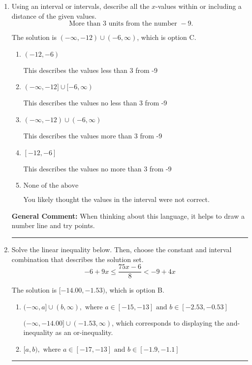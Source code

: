 \documentclass{extbook}[14pt]
\newcommand{\litem}[1]{\item #1

\rule{\textwidth}{0.4pt}}
\begin{document}
\begin{enumerate}
{\begin{enumerate}[label=\Alph*.]
 * Correct option.
\item \( (-\infty, a] \cup [b, \infty), \text{ where } a \in [-4.31, -3.55] \text{ and } b \in [1.2, 3.5] \)

Corresponds to including the endpoints (when they should be excluded).
\item \( (-\infty, \infty) \)

Corresponds to the variable canceling, which does not happen in this instance.
\end{enumerate}

\textbf{General Comment:} When multiplying or dividing by a negative, flip the sign.
}
\litem{
Using an interval or intervals, describe all the $x$-values within or including a distance of the given values.
\[ \text{ More than } 3 \text{ units from the number } -9. \]

The solution is \( (-\infty, -12) \cup (-6, \infty) \), which is option C.\begin{enumerate}[label=\Alph*.]
\item \( (-12, -6) \)

This describes the values less than 3 from -9
\item \( (-\infty, -12] \cup [-6, \infty) \)

This describes the values no less than 3 from -9
\item \( (-\infty, -12) \cup (-6, \infty) \)

This describes the values more than 3 from -9
\item \( [-12, -6] \)

This describes the values no more than 3 from -9
\item \( \text{None of the above} \)

You likely thought the values in the interval were not correct.
\end{enumerate}

\textbf{General Comment:} When thinking about this language, it helps to draw a number line and try points.
}
\litem{
Solve the linear inequality below. Then, choose the constant and interval combination that describes the solution set.
\[ -6 + 9 x \leq \frac{75 x - 6}{8} < -9 + 4 x \]

The solution is \( [-14.00, -1.53) \), which is option B.\begin{enumerate}[label=\Alph*.]
\item \( (-\infty, a] \cup (b, \infty), \text{ where } a \in [-15, -13] \text{ and } b \in [-2.53, -0.53] \)

$(-\infty, -14.00] \cup (-1.53, \infty)$, which corresponds to displaying the and-inequality as an or-inequality.
\item \( [a, b), \text{ where } a \in [-17, -13] \text{ and } b \in [-1.9, -1.1] \)


\end{enumerate}}
\end{enumerate}
\end{document}
